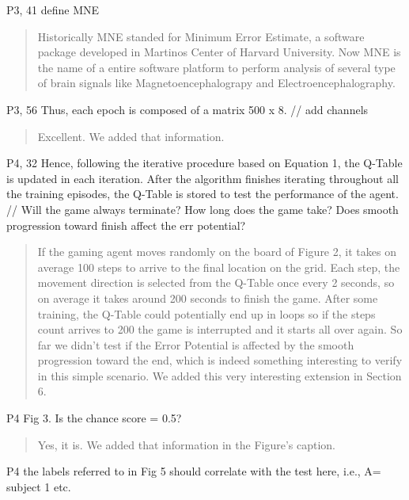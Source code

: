 \documentclass[journal,onecolumn,12pt]{IEEEtran}
\begin{document}
P3, 41 define MNE

\begin{quotation}
{\color{blue}
Historically MNE standed for Minimum Error Estimate, a software package developed in Martinos Center of Harvard University.  Now MNE  is the name of a entire software platform to perform analysis of several type of brain signals like Magnetoencephalograpy and Electroencephalography.
}
\end{quotation}

P3, 56 Thus, each epoch is composed of a matrix 500 x 8. // add channels

\begin{quotation}
{\color{blue}
Excellent.  We added that information.
}
\end{quotation}

P4, 32 Hence, following the iterative procedure based on Equation 1, the Q-Table is updated in each iteration. After the algorithm finishes iterating throughout all the training episodes, the Q-Table is stored to test the performance of the agent.
// Will the game always terminate? How long does the game take? Does smooth progression toward finish affect the err potential?

\begin{quotation}
{\color{blue}

If the gaming agent moves randomly on the board of Figure 2, it takes on average 100 steps to arrive to the final location on the grid.  Each step, the movement direction is selected from the Q-Table once every 2 seconds, so on average it takes around 200 seconds to finish the game.  After some training, the Q-Table could potentially end up in loops so if the steps count arrives to 200 the game is interrupted and it starts all over again.
So far we didn't test if the Error Potential is affected by the smooth progression toward the end, which is indeed something interesting to verify in this simple scenario.  We added this very interesting extension in Section 6.

}
\end{quotation}


P4 Fig 3. Is the chance score = 0.5?

\begin{quotation}
{\color{blue}
Yes, it is.  We added that information in the Figure's caption.
}
\end{quotation}

P4 the labels referred to in Fig 5 should correlate with the test here, i.e., A= subject 1 etc.
\end{document}
